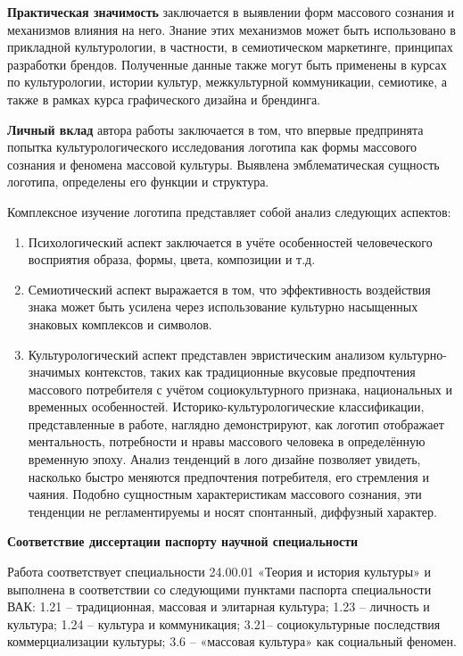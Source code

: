 \textbf{Практическая значимость} заключается в выявлении форм массового сознания и механизмов влияния на него. Знание этих механизмов может быть использовано в прикладной культурологии, в частности, в семиотическом маркетинге, принципах разработки брендов. Полученные данные также могут быть применены в курсах по культурологии, истории культур, межкультурной коммуникации, семиотике, а также в рамках курса графического дизайна и брендинга. 

\textbf{Личный вклад} автора работы заключается в том, что впервые предпринята попытка культурологического исследования логотипа как формы массового сознания и феномена массовой культуры. Выявлена эмблематическая сущность логотипа, определены его функции и структура.

Комплексное изучение логотипа представляет собой анализ следующих аспектов:
\begin{enumerate}
\item Психологический аспект заключается в учёте особенностей человеческого восприятия образа, формы, цвета, композиции и т.д. 
\item Семиотический аспект выражается в том, что эффективность воздействия знака может быть усилена через использование культурно насыщенных знаковых комплексов и символов.
\item Культурологический аспект представлен эвристическим анализом культурно-значимых контекстов, таких как традиционные вкусовые предпочтения массового потребителя с учётом социокультурного признака, национальных и временных особенностей. Историко-культурологические классификации, представленные в работе, наглядно демонстрируют, как логотип отображает ментальность, потребности и нравы массового человека в определённую временную эпоху. Анализ тенденций в лого дизайне позволяет увидеть, насколько быстро меняются предпочтения потребителя, его стремления и чаяния. Подобно сущностным характеристикам массового сознания, эти тенденции не регламентируемы и носят спонтанный, диффузный характер. 
\end{enumerate}

\textbf{Соответствие диссертации паспорту научной специальности}

Работа соответствует специальности 24.00.01 «Теория и история культуры» и выполнена в соответствии со следующими пунктами паспорта специальности ВАК: 1.21 – традиционная, массовая и элитарная культура; 1.23 – личность и культура; 1.24 – культура и коммуникация; 3.21– социокультурные последствия коммерциализации культуры; 3.6 – «массовая культура» как социальный феномен. 

